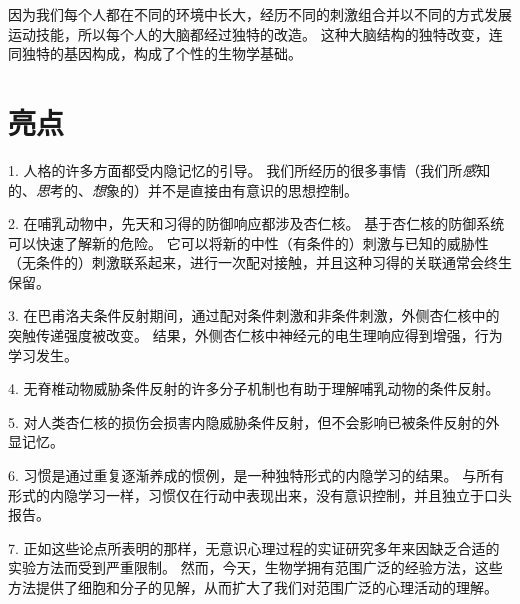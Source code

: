 因为我们每个人都在不同的环境中长大，经历不同的刺激组合并以不同的方式发展运动技能，所以每个人的大脑都经过独特的改造。
这种大脑结构的独特改变，连同独特的基因构成，构成了个性的生物学基础。



\section{亮点}

1. 人格的许多方面都受内隐记忆的引导。
我们所经历的很多事情（我们所\textit{感}知的、\textit{思}考的、\textit{想}象的）并不是直接由有意识的思想控制。


2. 在哺乳动物中，先天和习得的防御响应都涉及杏仁核。
基于杏仁核的防御系统可以快速了解新的危险。
它可以将新的中性（有条件的）刺激与已知的威胁性（无条件的）刺激联系起来，进行一次配对接触，并且这种习得的关联通常会终生保留。


3. 在巴甫洛夫条件反射期间，通过配对条件刺激和非条件刺激，外侧杏仁核中的突触传递强度被改变。
结果，外侧杏仁核中神经元的电生理响应得到增强，行为学习发生。


4. 无脊椎动物威胁条件反射的许多分子机制也有助于理解哺乳动物的条件反射。


5. 对人类杏仁核的损伤会损害内隐威胁条件反射，但不会影响已被条件反射的外显记忆。


6. 习惯是通过重复逐渐养成的惯例，是一种独特形式的内隐学习的结果。
与所有形式的内隐学习一样，习惯仅在行动中表现出来，没有意识控制，并且独立于口头报告。


7. 正如这些论点所表明的那样，无意识心理过程的实证研究多年来因缺乏合适的实验方法而受到严重限制。
然而，今天，生物学拥有范围广泛的经验方法，这些方法提供了细胞和分子的见解，从而扩大了我们对范围广泛的心理活动的理解。


